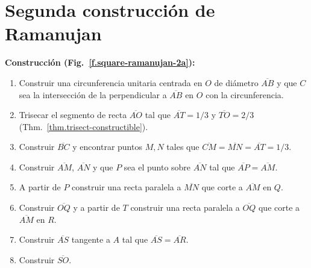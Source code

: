 

\section{Segunda construcción de Ramanujan}\label{s.square-ramanujan-second}

\textbf{Construcción  (Fig.~\ref{f.square-ramanujan-2a}):}
\begin{enumerate}

\item Construir una circunferencia unitaria centrada en $O$ de diámetro $\overline{AB}$ y que $C$ sea la intersección de la perpendicular a $\overline{AB}$ en $O$ con la circunferencia.

\item Trisecar el segmento de recta $\overline{AO}$ tal que $\overline{AT}=1/3$ y $\overline{TO}=2/3$ (Thm.~\ref{thm.trisect-constructible}).

\item Construir $\overline{BC}$ y encontrar puntos $M,N$ tales que $\overline{CM}=\overline{MN}=\overline{AT}=1/3$.

\item Construir $\overline{AM}$, $\overline{AN}$ y que $P$ sea el punto sobre $\overline{AN}$ tal que $\overline{AP}=\overline{AM}$.

\item A partir de $P$ construir una recta paralela a $\overline{MN}$ que corte a $\overline{AM}$ en $Q$.

\item Construir $\overline{OQ}$ y a partir de $T$ construir una recta paralela a $\overline{OQ}$ que corte a $\overline{AM}$ en $R$.

\item Construir $\overline{AS}$ tangente a $A$ tal que $\overline{AS}=\overline{AR}$.

\item Construir $\overline{SO}$.
\end{enumerate}

